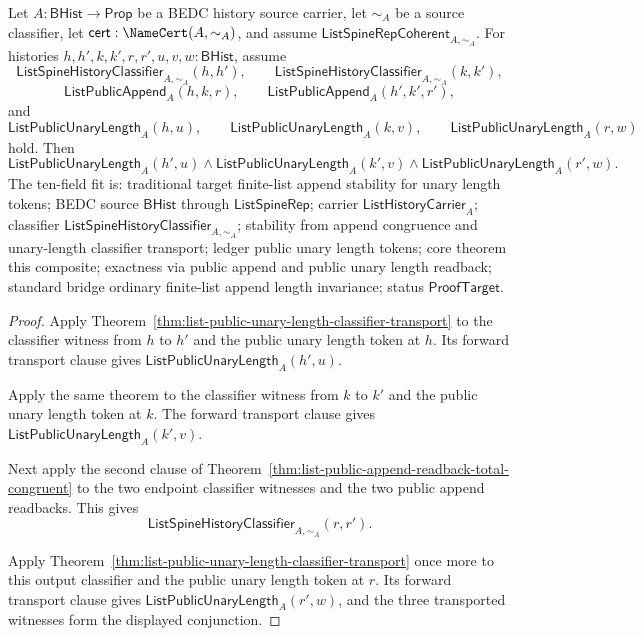 \begin{theorem}
\label{thm:list-public-append-unary-length-classifier-congruence}
Let $A:\mathsf{BHist}\to\mathsf{Prop}$ be a BEDC history source carrier, let
$\sim_A$ be a source classifier, let $\mathsf{cert}:\NameCert(A,\sim_A)$, and
assume $\mathsf{ListSpineRepCoherent}_{A,\sim_A}$. For histories
$h,h',k,k',r,r',u,v,w:\mathsf{BHist}$, assume
$$
\mathsf{ListSpineHistoryClassifier}_{A,\sim_A}(h,h'),\qquad
\mathsf{ListSpineHistoryClassifier}_{A,\sim_A}(k,k'),
$$
$$
\mathsf{ListPublicAppend}_A(h,k,r),\qquad
\mathsf{ListPublicAppend}_A(h',k',r'),
$$
and
$$
\mathsf{ListPublicUnaryLength}_A(h,u),\qquad
\mathsf{ListPublicUnaryLength}_A(k,v),\qquad
\mathsf{ListPublicUnaryLength}_A(r,w)
$$
hold. Then
$$
\mathsf{ListPublicUnaryLength}_A(h',u)\land
\mathsf{ListPublicUnaryLength}_A(k',v)\land
\mathsf{ListPublicUnaryLength}_A(r',w).
$$
The ten-field fit is: traditional target finite-list append stability for unary
length tokens; BEDC source $\mathsf{BHist}$ through $\mathsf{ListSpineRep}$;
carrier $\mathsf{ListHistoryCarrier}_A$; classifier
$\mathsf{ListSpineHistoryClassifier}_{A,\sim_A}$; stability from append
congruence and unary-length classifier transport; ledger public unary length
tokens; core theorem this composite; exactness via public append and public
unary length readback; standard bridge ordinary finite-list append length
invariance; status $\mathsf{ProofTarget}$.
\end{theorem}
\begin{proof}
Apply Theorem~\ref{thm:list-public-unary-length-classifier-transport} to the
classifier witness from $h$ to $h'$ and the public unary length token at $h$.
Its forward transport clause gives $\mathsf{ListPublicUnaryLength}_A(h',u)$.

Apply the same theorem to the classifier witness from $k$ to $k'$ and the
public unary length token at $k$. The forward transport clause gives
$\mathsf{ListPublicUnaryLength}_A(k',v)$.

Next apply the second clause of
Theorem~\ref{thm:list-public-append-readback-total-congruent} to the two
endpoint classifier witnesses and the two public append readbacks. This gives
$$
\mathsf{ListSpineHistoryClassifier}_{A,\sim_A}(r,r').
$$

Apply Theorem~\ref{thm:list-public-unary-length-classifier-transport} once more
to this output classifier and the public unary length token at $r$. Its forward
transport clause gives $\mathsf{ListPublicUnaryLength}_A(r',w)$, and the three
transported witnesses form the displayed conjunction.
\end{proof}

